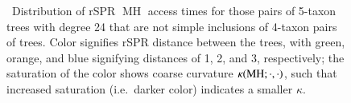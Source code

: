 \documentclass[]{elsarticle}
\let\MYoriglatexcaption\caption
\renewcommand{\caption}[2][\relax]{\MYoriglatexcaption[#2]{#2}}
\newcommand{\MH}{\operatorname{MH}}
\newcommand{\curvature}[2][]{%
    \ifthenelse{\equal{#1}{}}%
		{\kappa(#2)}%
		{\kappa_{#1}(#2)}%
}
\begin{document}
\begin{figure}
    \caption{\
        Distribution of rSPR $\MH$ access times for those pairs of 5-taxon trees with degree 24 that are not simple inclusions of 4-taxon pairs of trees.
        Color signifies rSPR distance between the trees, with green, orange, and blue signifying distances of 1, 2, and 3, respectively; the saturation of the color shows coarse curvature $\curvature{\MH; \cdot, \cdot}$, such that increased saturation (i.e.\ darker color) indicates a smaller $\kappa$.
        }
	\label{fig:kappa-access}
\end{figure}
\end{document}
